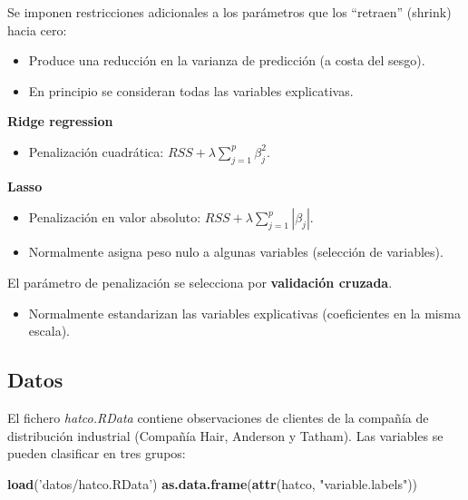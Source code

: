 \documentclass[]{book}
\newenvironment{Shaded}{\begin{snugshade}}{\end{snugshade}}
\newcommand{\KeywordTok}[1]{\textcolor[rgb]{0.13,0.29,0.53}{\textbf{#1}}}
\newcommand{\StringTok}[1]{\textcolor[rgb]{0.31,0.60,0.02}{#1}}
\newcommand{\NormalTok}[1]{#1}
\providecommand{\tightlist}{%
  \setlength{\itemsep}{0pt}\setlength{\parskip}{0pt}}
\begin{document}
Se imponen restricciones adicionales a los parámetros que los
``retraen'' (shrink) hacia cero:

\begin{itemize}
\item
  Produce una reducción en la varianza de predicción (a costa del
  sesgo).
\item
  En principio se consideran todas las variables explicativas.
\end{itemize}

\textbf{Ridge regression}

\begin{itemize}
\tightlist
\item
  Penalización cuadrática: \(RSS+\lambda\sum_{j=1}^{p}\beta_{j}^{2}\).
\end{itemize}

\textbf{Lasso}

\begin{itemize}
\item
  Penalización en valor absoluto:
  \(RSS+\lambda\sum_{j=1}^{p}|\beta_{j}|\).
\item
  Normalmente asigna peso nulo a algunas variables (selección de
  variables).
\end{itemize}

El parámetro de penalización se selecciona por \textbf{validación
cruzada}.

\begin{itemize}
\tightlist
\item
  Normalmente estandarizan las variables explicativas (coeficientes en
  la misma escala).
\end{itemize}

\subsection{Datos}\label{datos}

El fichero \emph{hatco.RData} contiene observaciones de clientes de la
compañía de distribución industrial (Compañía Hair, Anderson y Tatham).
Las variables se pueden clasificar en tres grupos:

\begin{Shaded}
\begin{Highlighting}[]
\KeywordTok{load}\NormalTok{(}\StringTok{'datos/hatco.RData'}\NormalTok{)}
\KeywordTok{as.data.frame}\NormalTok{(}\KeywordTok{attr}\NormalTok{(hatco, }\StringTok{"variable.labels"}\NormalTok{))}
\end{Highlighting}
\end{Shaded}
\end{document}
